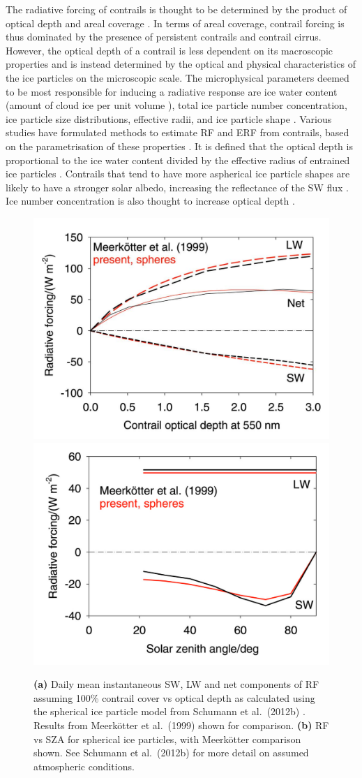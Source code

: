 The radiative forcing of contrails is thought to be determined by the product of optical depth and areal coverage \cite{Schumann2017}. In terms of areal coverage, contrail forcing is thus dominated by the presence of persistent contrails and contrail cirrus. However, the optical depth of a contrail is less dependent on its macroscopic properties and is instead determined by the optical and physical characteristics of the ice particles on the microscopic scale. The microphysical parameters deemed to be most responsible for inducing a radiative response are ice water content (amount of cloud ice per unit volume \cite{Karcher2018}), total ice particle number concentration, ice particle size distributions, effective radii, and ice particle shape \cite{Heymsfield2010}. Various studies have formulated methods to estimate RF and ERF from contrails, based on the parametrisation of these properties \cite{Meerkotter1999, Schumann2012a, Bickel2020}. It is defined that the optical depth is proportional to the ice water content divided by the effective radius of entrained ice particles \cite{Schumann2012a}. Contrails that tend to have more aspherical ice particle shapes are likely to have a stronger solar albedo, increasing the reflectance of the SW flux \cite{Meerkotter1999}. Ice number concentration is also thought to increase optical depth \cite{Karcher1999}. 

\begin{figure}[H]
	\centering
	\subfloat
		{
		\includegraphics[width=.35\textwidth]{RFvsOD.pdf}
		\label{RFvsOD}
		}
	\subfloat
		{
		\includegraphics[width=.345\textwidth]{RFvsSZA.pdf}
		\label{RFvsSZA}
		}
	\caption{\textbf{(a)} Daily mean instantaneous SW, LW and net components of RF assuming 100\% contrail cover vs optical depth as calculated using the spherical ice particle model from Schumann et al.\ (2012b) \cite{Schumann2012b}. Results from Meerk{\"o}tter et al.\ (1999) \cite{Meerkotter1999} shown for comparison. \textbf{(b)} RF vs SZA for spherical ice particles, with Meerk{\"o}tter comparison shown. See Schumann et al.\ (2012b) \cite{Schumann2012b} for more detail on assumed atmospheric conditions.}
	\label{}
\end{figure}

